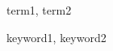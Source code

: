 \documentclass[preprint]{sigplanconf}
\begin{document}

\terms
term1, term2

\keywords
keyword1, keyword2






%


%
%
\end{document}

